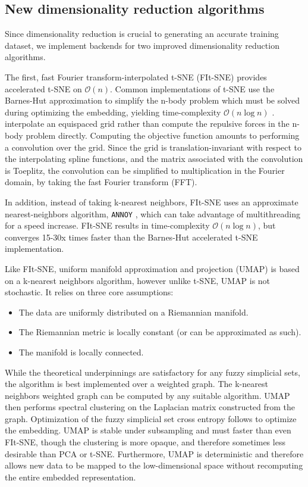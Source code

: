 \documentclass{article}
\begin{document}
\subsection{New dimensionality reduction algorithms}

Since dimensionality reduction is crucial to generating an accurate training dataset,
we implement backends for two improved dimensionality reduction algorithms.

The first, fast Fourier transform-interpolated t-SNE (FIt-SNE)
provides accelerated t-SNE on $\mathcal{O}(n)$.
Common implementations of t-SNE use the Barnes-Hut approximation to simplify the n-body problem
which must be solved during optimizing the embedding, yielding time-complexity $\mathcal{O}(n \log n)$ \autocite{vandermaatenAcceleratingTSNEUsing2014}.
\cite{lindermanFastInterpolationbasedTSNE2019} interpolate an equispaced grid
rather than compute the repulsive forces in the n-body problem directly.
Computing the objective function amounts to performing a convolution over the grid.
Since the grid is translation-invariant with respect to the interpolating spline functions,
and the matrix associated with the convolution is Toeplitz,
the convolution can be simplified to multiplication in the Fourier domain,
by taking the fast Fourier transform (FFT).

In addition, instead of taking k-nearest neighbors,
FIt-SNE uses an approximate nearest-neighbors algorithm, \texttt{ANNOY} \autocite{bernhardssonApproximateNearestNeighbors2019},
which can take advantage of multithreading for a speed increase.
FIt-SNE results in time-complexity $\mathcal{O}(n \log n)$,
but converges 15-30x times faster than the Barnes-Hut accelerated t-SNE implementation.

Like FIt-SNE, uniform manifold approximation and projection (UMAP) \autocite{mcinnesUMAPUniformManifold2018}
is based on a k-nearest neighbors algorithm, however unlike t-SNE, UMAP is not stochastic.
It relies on three core assumptions:

\begin{itemize}
  \item The data are uniformly distributed on a Riemannian manifold.
  \item The Riemannian metric is locally constant (or can be approximated as such).
  \item The manifold is locally connected.
\end{itemize}

While the theoretical underpinnings are satisfactory for any fuzzy simplicial sets,
the algorithm is best implemented over a weighted graph.
The k-nearest neighbors weighted graph can be computed by any suitable algorithm.
UMAP then performs spectral clustering on the Laplacian matrix constructed from the graph.
Optimization of the fuzzy simplicial set cross entropy follows to optimize the embedding.
UMAP is stable under subsampling and must faster than even FIt-SNE,
though the clustering is more opaque, and therefore sometimes less desirable than PCA or t-SNE.
Furthermore, UMAP is deterministic and therefore allows new data to be mapped to the low-dimensional space
without recomputing the entire embedded representation.
\end{document}
